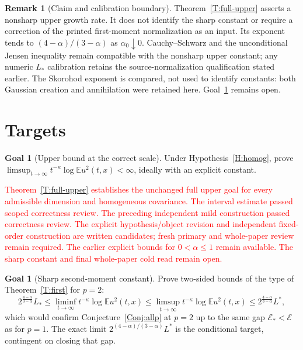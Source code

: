 \documentclass[12pt]{article}
\numberwithin{equation}{section}
\theoremstyle{definition}
\newtheorem{remark}[theorem]{Remark}
\newtheorem{goal}[theorem]{Goal}
\newcommand{\E}{\mathbb{E}}
\newcommand{\cE}{\mathcal{E}}
\newcommand{\myCmts}[1]{\begin{framed}\noindent\textcolor{red}{#1}\end{framed}}
\begin{document}
\begin{remark}[Claim and calibration boundary]\label{R:full-upper-boundary}
  Theorem~\ref{T:full-upper} asserts a nonsharp upper growth rate.
  It does not identify the sharp constant or require a correction of the
  printed first-moment normalization as an input.
  Its exponent tends to $(4-\alpha)/(3-\alpha)$ as $\alpha_0\downarrow0$.
  Cauchy--Schwarz and the unconditional Jensen inequality remain compatible
  with the nonsharp upper constant; any numeric $L_*$ calibration retains
  the source-normalization qualification stated earlier.
  The Skorohod exponent is compared, not used to identify constants:
  both Gaussian creation and annihilation were retained here.
  Goal~\ref{G:sharp} remains open.
\end{remark}


\section{Targets}\label{S:targets}

\begin{goal}[Upper bound at the correct scale]\label{G:upper}
  Under Hypothesis~\ref{H:homog}, prove
  $\limsup_{t\to\infty}t^{-\kappa}\log\E u^2(t,x)<\infty$, ideally with an
  explicit constant.
\end{goal}

\myCmts{Theorem~\ref{T:full-upper} establishes the unchanged full upper
goal for every admissible dimension and homogeneous covariance.
The interval estimate passed scoped correctness review.
The preceding independent mild construction passed correctness review.
The explicit hypothesis/object revision and independent fixed-order
construction are written candidates; fresh primary and whole-paper
review remain required.
The earlier explicit bounds for $0<\alpha\le1$ remain available.
The sharp constant and final whole-paper cold read remain open.}

\begin{goal}[Sharp second-moment constant]\label{G:sharp}
  Prove two-sided bounds of the type of Theorem~\ref{T:first} for $p=2$:
  \[
    2^{\frac{4-\alpha}{3-\alpha}}L_*
    \le\liminf_{t\to\infty}t^{-\kappa}\log\E u^2(t,x)
    \le\limsup_{t\to\infty}t^{-\kappa}\log\E u^2(t,x)
    \le2^{\frac{4-\alpha}{3-\alpha}}L^*,
  \]
  which would confirm Conjecture~\ref{Conj:allp} at $p=2$ up to the same gap
  $\cE_*<\cE$ as for $p=1$. The exact limit
  $2^{(4-\alpha)/(3-\alpha)}L^*$ is the conditional target, contingent on
  closing that gap.
\end{goal}
\end{document}
